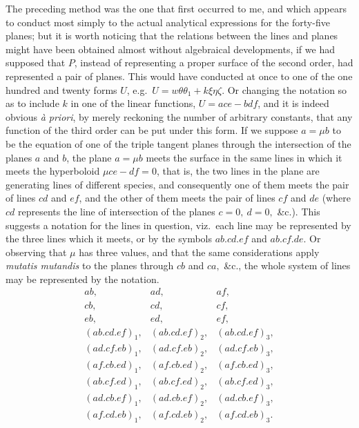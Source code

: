 \documentclass[11pt]{article}
\begin{document}
The preceding method was the one that first occurred to me, and which appears to conduct most simply to the actual analytical expressions for the forty-five planes; but it is worth noticing that the relations between the lines and planes might have been obtained almost without algebraical developments, if we had supposed that $P$, instead of representing a proper surface of the second order, had represented a pair of planes. This would have conducted at once to one of the one hundred and twenty forms $U$, e.g.\ $U = w\theta\theta_1 + k\xi\eta\zeta$. Or changing the notation so as to include $k$ in one of the linear functions, $U = ace - bdf$, and it is indeed obvious \textit{\`a priori}, by merely reckoning the number of arbitrary constants, that any function of the third order can be put under this form. If we suppose $a = \mu b$ to be the equation of one of the triple tangent planes through the intersection of the planes $a$ and $b$, the plane $a = \mu b$ meets the surface in the same lines in which it meets the hyperboloid $\mu ce - df = 0$, that is, the two lines in the plane are generating lines of different species, and consequently one of them meets the pair of lines $cd$ and $ef$, and the other of them meets the pair of lines $cf$ and $de$ (where $cd$ represents the line of intersection of the planes $c = 0,\ d = 0,$ \&c.). This suggests a notation for the lines in question, viz.\ each line may be represented by the three lines which it meets, or by the symbols $ab.cd.ef$ and $ab.cf.de$. Or observing that $\mu$ has three values, and that the same considerations apply \textit{mutatis mutandis} to the planes through $cb$ and $ca,$ \&c., the whole system of lines may be represented by the notation.
\[
\begin{array}{lll}
ab, & ad, & af,\\
cb, & cd, & cf,\\
eb, & ed, & ef,\\
(ab.cd.ef)_1, & (ab.cd.ef)_2, & (ab.cd.ef)_3,\\
(ad.cf.eb)_1, & (ad.cf.eb)_2, & (ad.cf.eb)_3,\\
(af.cb.ed)_1, & (af.cb.ed)_2, & (af.cb.ed)_3,\\
(ab.cf.ed)_1, & (ab.cf.ed)_2, & (ab.cf.ed)_3,\\
(ad.cb.ef)_1, & (ad.cb.ef)_2, & (ad.cb.ef)_3,\\
(af.cd.eb)_1, & (af.cd.eb)_2, & (af.cd.eb)_3.
\end{array}
\]
\end{document}
